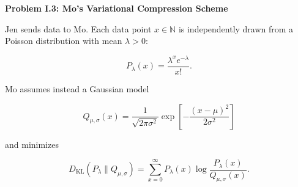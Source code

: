 \documentclass[11pt]{article}
\newcommand{\problem}[1]{%
    \vspace{1em}
    {\large\bfseries #1}
    \par
    \vspace{0.4em}
}
\newcommand{\KL}{D_{\mathrm{KL}}}
\begin{document}

\problem{Problem I.3: Mo's Variational Compression Scheme}

Jen sends data to Mo. Each data point \(x\in\mathbb N\) is independently drawn
from a Poisson distribution with mean \(\lambda>0\):

\[
P_\lambda(x)=\frac{\lambda^x e^{-\lambda}}{x!}.
\]

Mo assumes instead a Gaussian model

\[
Q_{\mu,\sigma}(x)=\frac{1}{\sqrt{2\pi\sigma^2}}
\exp\left[-\frac{(x-\mu)^2}{2\sigma^2}\right]
\]

and minimizes

\[
\KL(P_\lambda\|Q_{\mu,\sigma})
=
\sum_{x=0}^{\infty}
P_\lambda(x)
\log\frac{P_\lambda(x)}{Q_{\mu,\sigma}(x)}.
\]
\end{document}
